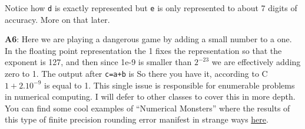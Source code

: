 Notice how \texttt{d} is exactly represented but \texttt{e} is only represented to about 7 digits of accuracy. More on that later.

{\bf A6}: Here we are playing a dangerous game by adding a small number to a one. In the floating point representation the 1 fixes the representation so that the exponent is 127, and then since 1e-9 is smaller than $2^{-23}$ we are effectively adding zero to 1. The output after \texttt{c=a+b} is
So there you have it, according to C $1+2.10^{-9}$ is equal to 1. This single issue is responsible for enumerable problems in numerical computing. I will defer to other classes to cover this in more depth. You can find some cool examples  of ``Numerical Monsters'' where the results of this type of finite precision rounding error manifest in strange ways \href{https://dl.acm.org/citation.cfm?id=377635}{here}.